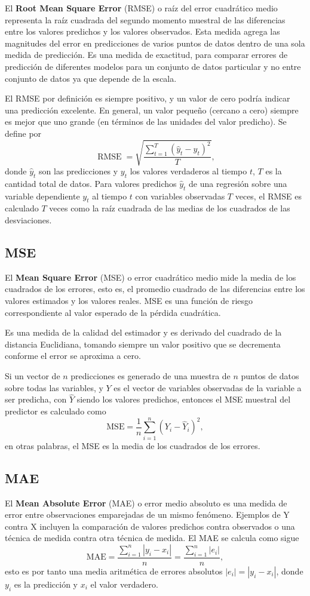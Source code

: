 El \textbf{Root Mean Square Error} (RMSE) o raíz del error cuadrático medio representa la raíz cuadrada del segundo momento muestral de las diferencias entre los valores predichos y los valores observados. Esta medida agrega las magnitudes del error en predicciones de varios puntos de datos dentro de una sola medida de predicción.
Es una medida de exactitud, para comparar errores de predicción de diferentes modelos para un conjunto de datos particular y no entre conjunto de datos ya que depende de la escala.

El RMSE por definición es siempre positivo, y un valor de cero podría indicar una predicción excelente. En general, un valor pequeño (cercano a cero) siempre es mejor que uno grande (en términos de las unidades del valor predicho). Se define por
\[
\operatorname{RMSE}=\sqrt{\frac{\sum_{t=1}^{T}\left(\hat{y}_{t}-y_{t}\right)^{2}}{T}},
\] 
donde $\hat{y}_t$ son las predicciones y $y_t$ los valores verdaderos al tiempo $t$, $T$ es la cantidad total de datos.
Para valores predichos $\hat{y}_t$ de una regresión sobre una variable dependiente $y_t$ al tiempo $t$ con variables observadas $T$ veces, el RMSE es calculado $T$ veces como la raíz cuadrada de las medias de los cuadrados de las desviaciones.

\subsection{MSE}

El \textbf{Mean Square Error} (MSE) o error cuadrático medio mide la media de los cuadrados de los errores, esto es, el promedio cuadrado de las diferencias entre los valores estimados y los valores reales. MSE es una función de riesgo correspondiente al valor esperado de la pérdida cuadrática.

Es una medida de la calidad del estimador y es derivado del cuadrado de la distancia Euclidiana, tomando siempre un valor positivo que se decrementa conforme el error se aproxima a cero.

Si un vector de $n$ predicciones es generado de una muestra de $n$ puntos de datos sobre todas las variables, y $Y$ es el vector de variables observadas de la variable a ser predicha, con $\hat{Y}$ siendo los valores predichos, entonces el MSE muestral del predictor es calculado como
\[
\mathrm{MSE}=\frac{1}{n} \sum_{i=1}^{n}\left(Y_{i}-\hat{Y}_{i}\right)^{2},
\]
en otras palabras, el MSE es la media de los cuadrados de los errores. 

\subsection{MAE}
El \textbf{Mean Absolute Error} (MAE) o error medio absoluto es una medida de error entre observaciones emparejadas de un mismo fenómeno. Ejemplos de Y contra X incluyen la comparación de valores predichos contra observados o una técnica de medida contra otra técnica de medida. El MAE se calcula como sigue
\[
\mathrm{MAE}=\frac{\sum_{i=1}^{n}\left|y_{i}-x_{i}\right|}{n}=\frac{\sum_{i=1}^{n}\left|e_{i}\right|}{n},
\] 
esto es por tanto una media aritmética de errores absolutos $\left|e_{i}\right| = \left|y_{i}-x_{i}\right|$, donde $y_i$ es la predicción y $x_i$ el valor verdadero.

